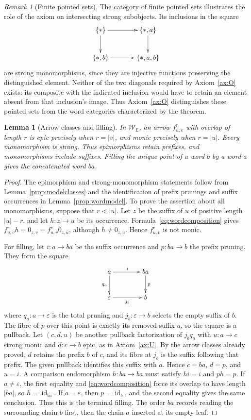 \documentclass[11pt,a4paper]{article}
\theoremstyle{plain}
\newtheorem{lemma}[theorem]{Lemma}
\theoremstyle{definition}
\theoremstyle{remark}
\newtheorem{remark}[theorem]{Remark}
\newcommand{\id}{\operatorname{id}}
\begin{document}
\begin{remark}[Finite pointed sets]
The category of finite pointed sets illustrates the role of the
axiom on intersecting strong subobjects. Its inclusions in the square
\[
\xymatrix@C=3.5em@R=2.5em{
\{*\}\ar[r]\ar[d]&\{*,a\}\ar[d]\\
\{*,b\}\ar[r]&\{*,a,b\}
}
\]
are strong monomorphisms, since they are injective functions preserving
the distinguished element. Neither of the two diagonals required by
Axiom~\ref{ax:O} exists: its composite with the indicated inclusion
would have to retain an element absent from that inclusion's image.
Thus Axiom~\ref{ax:O} distinguishes these pointed sets from the
word categories characterized by the theorem.
\end{remark}

\begin{lemma}[Arrow classes and filling]\label{prop:wordarrows}
In $\mathcal W_L$, an arrow $f^r_{u,v}$ with overlap of length
$r$ is epic precisely when
$r=|v|$, and monic precisely when $r=|u|$.
Every monomorphism is strong. Thus epimorphisms retain prefixes,
and monomorphisms include suffixes.
Filling the unique point of a word $b$ by a word $a$ gives the
concatenated word $ba$.
\end{lemma}
\begin{proof}
The epimorphism and strong-monomorphism statements follow from
Lemma~\ref{prop:modelclasses} and the identification of
prefix prunings and suffix occurrences in
Lemma~\ref{prop:wordmodel}.
To prove the assertion about all monomorphisms, suppose that $r<|u|$.
Let $z$ be the suffix of $u$ of positive length $|u|-r$, and let
$h:z\to u$ be its occurrence. Formula~\eqref{eq:wordcomposition}
gives $f^r_{u,v}h=0_{z,v}=f^r_{u,v}0_{z,u}$, although
$h\ne0_{z,u}$. Hence $f^r_{u,v}$ is not monic.

For filling, let $i:a\to ba$ be the suffix occurrence and
$p:ba\to b$ the prefix pruning. They form the square
\[
\xymatrix@C=4em@R=2.5em{
a \ar[r]^{i} \ar[d]_{q_a} & ba \ar[d]^{p} \\
 \varepsilon \ar[r]_{j_b} & b
}
\]
where $q_a:a\to\varepsilon$ is the total pruning and
$j_b:\varepsilon\to b$ selects the empty suffix of $b$.
The fibre of $p$ over this point
is exactly its removed suffix $a$, so the square is a pullback.
Let $(c,d,u)$ be another pullback factorization of $j_bq_a$ with
$u:a\to c$ strong monic and $d:c\to b$ epic, as in
Axiom~\ref{ax:U}. By the arrow classes already proved, $d$ retains
the prefix $b$ of $c$, and its fibre at $j_b$ is the suffix following
that prefix. The given pullback identifies this suffix with $a$.
Hence $c=ba$, $d=p$, and $u=i$.
A comparison endomorphism $h:ba\to ba$ must satisfy $hi=i$ and
$ph=p$.
If $a\ne\varepsilon$, the first equality and
\eqref{eq:wordcomposition} force its overlap to have length $|ba|$,
so $h=\id_{ba}$. If $a=\varepsilon$, then $p=\id_b$, and the
second equality gives the same conclusion. Thus this is the terminal filling.
The order $ba$ records reading the surrounding chain $b$ first,
then the chain $a$ inserted at its empty leaf.
\end{proof}
\end{document}
